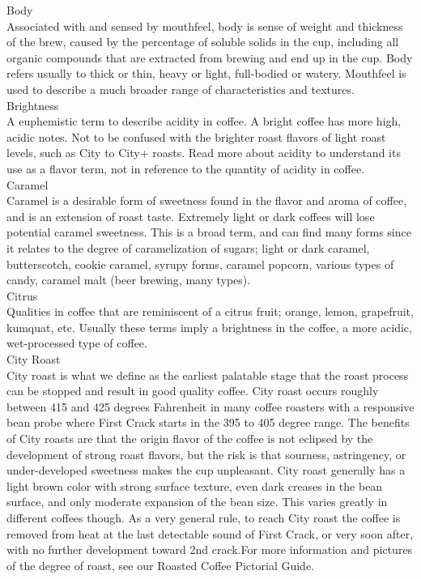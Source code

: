 \documentclass[10pt,twoside,footinclude=true,headinclude=true]{scrbook} %
\begin{document}
\begin{multicols}{2}

{\smallcaps \small Body}\\
Associated with and sensed by mouthfeel, body is sense of weight and thickness of the brew, caused by the percentage of soluble solids in the cup, including all organic compounds that are extracted from brewing and end up in the cup. Body refers usually to thick or thin, heavy or light, full-bodied or watery. Mouthfeel is used to describe a much broader range of characteristics and textures.\\
\medskip
{\smallcaps \small Brightness}\\
A euphemistic term to describe acidity in coffee. A bright coffee has more high, acidic notes. Not to be confused with the brighter roast flavors of light roast levels, such as City to City+ roasts. Read more about acidity to understand its use as a flavor term, not in reference to the quantity of acidity in coffee.\\
\medskip
{\smallcaps \small Caramel}\\
Caramel is a desirable form of sweetness found in the flavor and aroma of coffee, and is an extension of roast taste. Extremely light or dark coffees will lose potential caramel sweetness. This is a broad term, and can find many forms since it relates to the degree of caramelization of sugars; light or dark caramel, butterscotch, cookie caramel, syrupy forms, caramel popcorn, various types of candy, caramel malt (beer brewing, many types).\\
\medskip
{\smallcaps \small Citrus}\\
Qualities in coffee that are reminiscent of a citrus fruit; orange, lemon, grapefruit, kumquat, etc. Usually these terms imply a brightness in the coffee, a more acidic, wet-processed type of coffee.\\
\medskip
{\smallcaps \small City Roast}\\
City roast is what we define as the earliest palatable stage that the roast process can be stopped and result in good quality coffee. City roast occurs roughly between 415 and 425 degrees Fahrenheit in many coffee roasters with a responsive bean probe where First Crack starts in the 395 to 405 degree range. The benefits of City roasts are that the origin flavor of the coffee is not eclipsed by the development of strong roast flavors, but the risk is that sourness, astringency, or under-developed sweetness makes the cup unpleasant. City roast generally has a light brown color with strong surface texture, even dark creases in the bean surface, and only moderate expansion of the bean size. This varies greatly in different coffees though. As a very general rule, to reach City roast the coffee is removed from heat at the last detectable sound of First Crack, or very soon after, with no further development toward 2nd crack.For more information and pictures of the degree of roast, see our  Roasted Coffee Pictorial Guide.\\

\end{multicols}
\end{document}
